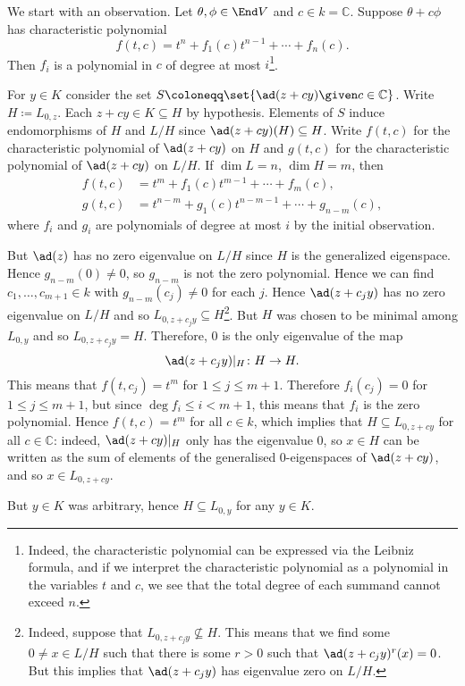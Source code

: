 We start with an observation. Let $\theta, \phi \in \End V$ and $c \in k = \mathbb{C}$.
Suppose $\theta + c\phi$ has characteristic polynomial
\[ f(t, c) = t^n + f_1(c)t^{n-1} + \cdots + f_n(c). \]
 Then $f_i$ is a polynomial in $c$ of degree  at most $i$\footnote{Indeed, the
 characteristic polynomial can be expressed via the Leibniz formula, and
 if we interpret the characteristic polynomial as a polynomial in the variables
 $t$ and $c$, we see that the total degree of each summand cannot exceed $n$.}.

For $y \in K$ consider the set $S \coloneqq \set{\ad(z + cy)\given c \in \mathbb{C}}$.
Write $H\coloneqq L_{0, z}$. Each $z + cy \in K \subseteq H$ by hypothesis.
Elements of $S$ induce endomorphisms of $H$ and $L/H$ since
$\ad(z + cy)(H) \subseteq H$. Write $f(t, c)$ for the characteristic
polynomial of $\ad(z + cy)$ on $H$ and $g(t, c)$ for the characteristic
polynomial of $\ad(z + cy)$ on $L/H$. If $\dim L = n$, $\dim H = m$, then
\begin{align*}
	f(t, c) &= t^m + f_1(c)t^{m-1} + \cdots + f_m(c),\\
	g(t, c) &= t^{n-m} + g_1(c)t^{n-m-1} + \cdots + g_{n - m}(c),
\end{align*}
where $f_i$ and $g_i$ are polynomials of degree at most $i$ by the initial observation.

But $\ad(z)$ has no zero eigenvalue on $L/H$ since $H$ is the generalized eigenspace.
Hence $g_{n-m}(0) \neq 0$, so $g_{n-m}$ is not the zero polynomial. Hence we can find
$c_1, \ldots, c_{m+1} \in k$ with $g_{n-m}(c_j)\neq 0$ for each $j$. Hence
$\ad(z + c_jy)$ has no zero eigenvalue on $L/H$ and so
$L_{0, z + c_jy} \subseteq H$\footnote{Indeed,
suppose that $L_{0, z + c_jy}\nsubseteq H$. This means that we find
some $0\neq x \in L/H$ such that there is some $r>0$ such that
$\ad(z + c_jy)^r(x) = 0$. But this implies that $\ad(z + c_jy)$ has eigenvalue
zero on $L/H$.}.
But $H$ was chosen to be minimal among $L_{0, y}$ and so $L_{0, z+c_jy} = H$.
Therefore, $0$ is the only eigenvalue of the map
\[ \ad(z + c_jy)|_H\colon H\to H. \]
This means that $f(t, c_j) = t^m$ for $1\leq j\leq m+1$. Therefore
$f_i(c_j) = 0$ for $1\leq j\leq m+1$, but since $\deg f_i\leq i < m+1$, this means
that $f_i$ is the zero polynomial. Hence $f(t, c) = t^m$ for all $c \in k$, which
implies that $H \subseteq L_{0, z+cy}$ for all $c \in \mathbb{C}$: indeed,
$\ad(z + cy)|_H$ only has the eigenvalue $0$, so $x\in H$ can be written as the
sum of elements of the generalised $0$-eigenspaces of $\ad(z + cy)$, and so
$x \in L_{0, z + cy}$.

But $y \in K$ was arbitrary, hence $H \subseteq L_{0, y}$ for any $y \in K$.
